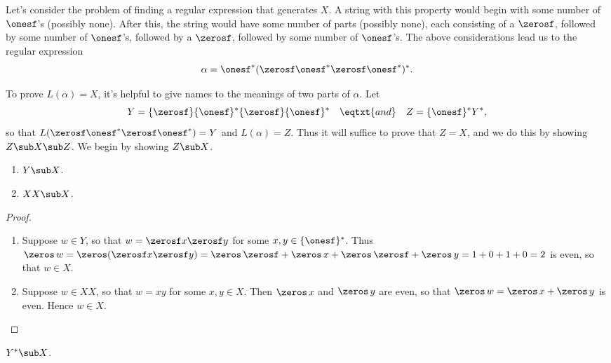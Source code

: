 Let's consider the problem of finding a regular expression that
generates $X$.  A string with this property would begin with some
number of $\onesf$'s (possibly none).  After this, the string would
have some number of parts (possibly none), each consisting of a
$\zerosf$, followed by some number of $\onesf$'s, followed by a
$\zerosf$, followed by some number of $\onesf$'s.  The above
considerations lead us to the regular expression
\begin{displaymath}
\alpha=\onesf^*(\zerosf\onesf^*\zerosf\onesf^*)^* .
\end{displaymath}

To prove $L(\alpha) = X$, it's helpful to give names
to the meanings of two parts of $\alpha$.  Let
\begin{displaymath}
Y = \{\zerosf\}\{\onesf\}^*\{\zerosf\}\{\onesf\}^*
\quad \eqtxt{and} \quad
Z = \{\onesf\}^* Y^* ,
\end{displaymath}
so that $L(\zerosf\onesf^*\zerosf\onesf^*) = Y$ and
$L(\alpha) = Z$.  Thus it will suffice to prove that $Z = X$,
and we do this by showing $Z\sub X\sub Z$.  We begin by showing
$Z\sub X$.

\begin{lemma}
\label{RegSyn1Lem1}
\begin{enumerate}[\quad(1)]
\item $Y\sub X$.

\item $XX\sub X$.
\end{enumerate}
\end{lemma}

\begin{proof}
\begin{enumerate}[\quad(1)]
\item Suppose $w\in Y$, so that $w=\zerosf x\zerosf y$ for some
$x,y\in\{\onesf\}^*$.  Thus $\zeros\,w = \zeros(\zerosf x\zerosf y) =
\zeros\,\zerosf + \zeros\,x + \zeros\,\zerosf + \zeros\,y =
1 + 0 + 1 + 0 = 2$ is even, so that $w\in X$.

\item Suppose $w\in XX$, so that $w=xy$ for some $x,y\in X$.  Then
$\zeros\,x$ and $\zeros\,y$ are even, so that $\zeros\,w =
\zeros\,x + \zeros\,y$ is even.  Hence $w\in X$.
\end{enumerate}
\end{proof}

\begin{lemma}
\label{RegSyn1Lem2}
$Y^*\sub X$.
\end{lemma}

